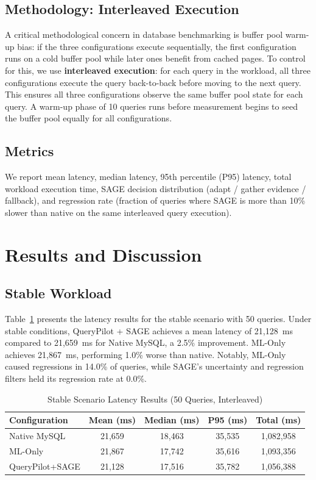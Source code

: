 \documentclass[conference]{IEEEtran}
\begin{document}
\subsection*{Methodology: Interleaved Execution}
A critical methodological concern in database benchmarking is buffer pool
warm-up bias: if the three configurations execute sequentially, the first
configuration runs on a cold buffer pool while later ones benefit from cached
pages. To control for this, we use \textbf{interleaved execution}: for each
query in the workload, all three configurations execute the query
back-to-back before moving to the next query. This ensures all three
configurations observe the same buffer pool state for each query. A warm-up
phase of 10 queries runs before measurement begins to seed the buffer pool
equally for all configurations.

\subsection*{Metrics}
We report mean latency, median latency, 95th percentile (P95) latency, total
workload execution time, SAGE decision distribution (adapt / gather evidence
/ fallback), and regression rate (fraction of queries where SAGE is more
than 10\% slower than native on the same interleaved query execution).

\section{Results and Discussion}

\subsection*{Stable Workload}

Table~\ref{tab:stable} presents the latency results for the stable scenario
with 50 queries. Under stable conditions, QueryPilot + SAGE achieves a mean
latency of 21,128~ms compared to 21,659~ms for Native MySQL, a 2.5\%
improvement. ML-Only achieves 21,867~ms, performing 1.0\% worse than native.
Notably, ML-Only caused regressions in 14.0\% of queries, while SAGE's
uncertainty and regression filters held its regression rate at 0.0\%.

\begin{table}[htbp]
\centering
\caption{Stable Scenario Latency Results (50 Queries, Interleaved)}
\renewcommand{\arraystretch}{1.3}
\begin{tabular}{|l|c|c|c|c|}
\hline
\textbf{Configuration} & \textbf{Mean (ms)} & \textbf{Median (ms)} &
\textbf{P95 (ms)} & \textbf{Total (ms)} \\
\hline
Native MySQL    & 21,659 & 18,463 & 35,535 & 1,082,958 \\
ML-Only         & 21,867 & 17,742 & 35,616 & 1,093,356 \\
QueryPilot+SAGE & 21,128 & 17,516 & 35,782 & 1,056,388 \\
\hline
\end{tabular}
\label{tab:stable}
\end{table}
\end{document}
